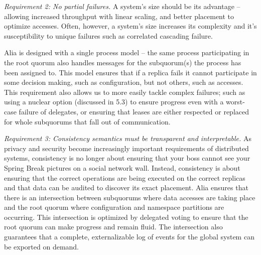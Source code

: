 \documentclass[10pt,conference]{IEEEtran}
\begin{document}
\emph{Requirement 2: No partial failures.}
A system's size should be its advantage -- allowing increased throughput with linear
scaling, and better placement to optimize accesses.
Often, however, a system's size increases its complexity and it's susceptibility
to unique failures such as correlated cascading failure.

Alia is designed with a single process model -- the same process participating in
the root quorum also handles messages for the subquorum(s) the process has been
assigned to.
This model ensures that if a replica fails it cannot participate in some decision
making, such as configuration, but not others, such as accesses.
This requirement also allows us to more easily tackle complex failures; such as
using a nuclear option (discussed in 5.3) to ensure progress even with a worst-case
failure of delegates, or ensuring that leases are either respected or replaced
for whole subquorums that fall out of communication.

\emph{Requirement 3: Consistency semantics must be transparent and interpretable.}
As privacy and security become increasingly important requirements of distributed
systems, consistency is no longer about ensuring that your boss cannot see your
Spring Break pictures on a social network wall.
Instead, consistency is about ensuring that the correct operations are being
executed on the correct replicas and that data can be audited to discover its
exact placement.
Alia ensures that there is an intersection between subquorums where data accesses
are taking place and the root quorum where configuration and namespace partitions
are occurring.
This intersection is optimized by delegated voting to ensure that the root
quorum can make progress and remain fluid.
The intersection also guarantees that a complete, externalizable log of events
for the global system can be exported on demand.



\end{document}
